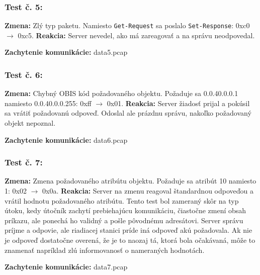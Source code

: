 \subsubsection{Test č. 5:}
\textbf{Zmena:} Zlý typ paketu. Namiesto {\tt Get-Request} sa poslalo {\tt Set-Response}: 0xc0 $\rightarrow$ 0xc5. \newline
\textbf{Reakcia:} Server nevedel, ako má zareagovať a na správu neodpovedal. \par
\noindent \textbf{Zachytenie komunikácie:} data5.pcap
\subsubsection{Test č. 6:}
\textbf{Zmena:} Chybný OBIS kód požadovaného objektu. Požaduje sa 0.0.40.0.0.1 namiesto 0.0.40.0.0.255: 0xff $\rightarrow$ 0x01. \newline
\textbf{Reakcia:} Server žiadosť prijal a pokúsil sa vrátiť požadovanú odpoveď. Odoslal ale prázdnu správu, nakoľko požadovaný objekt nepoznal. \par
\noindent \textbf{Zachytenie komunikácie:} data6.pcap
\subsubsection{Test č. 7:}
\textbf{Zmena:} Zmena požadovaného atribútu objektu. Požaduje sa atribút 10 namiesto 1: 0x02 $\rightarrow$ 0x0a. \newline
\textbf{Reakcia:} Server na zmenu reagoval štandardnou odpoveďou a vrátil hodnotu požadovaného atribútu. Tento test bol zameraný skôr na typ útoku, kedy útočník zachytí prebiehajúcu komunikáciu, čiastočne zmení obsah príkazu, ale ponechá ho validný a pošle pô\-vod\-né\-mu adresátovi. Server správu príjme a odpovie, ale riadiacej stanici príde iná odpoveď akú požadovala. Ak nie je odpoveď dostatočne overená, že je to naozaj tá, ktorá bola očakávaná, môže to znamenať napríklad zlú informovanosť o nameraných hodnotách. \par
\noindent \textbf{Zachytenie komunikácie:} data7.pcap
